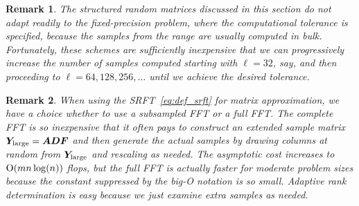 \documentclass[final]{siamltex}
\newtheorem{remark}{Remark}[section]
\begin{document}
\lsp

\begin{remark}\rm
\label{remark:SRFT_fixedaccuracy}
The structured random matrices discussed in this section
do not adapt readily to the fixed-precision problem, where
the computational tolerance is specified, because the
samples from the range are usually computed in bulk.
Fortunately, these schemes are sufficiently inexpensive that
we can progressively increase the number of samples
computed starting with $\ell = 32$, say, and then
proceeding to $\ell = 64, 128, 256, \dots$ until we achieve
the desired tolerance.
\end{remark}

\lsp

\begin{remark}\rm
When using the SRFT~\eqref{eq:def_srft} for matrix approximation,
we have a choice whether to use a subsampled FFT or a full FFT.
The complete FFT is so inexpensive that it often pays to construct
an extended sample matrix $\bm{Y}_{\rm large} = \bm{ADF}$
and then generate the actual samples by drawing columns at random
from $\bm{Y}_{\rm large}$ and rescaling as needed.
The asymptotic cost increases to $\mathrm{O}(mn\log(n))$
flops, but the full FFT is actually faster for moderate problem
sizes because the constant suppressed by the big-O notation is so
small.  Adaptive rank determination is easy because we just examine
extra samples as needed.
\end{remark}
%


\end{document}
